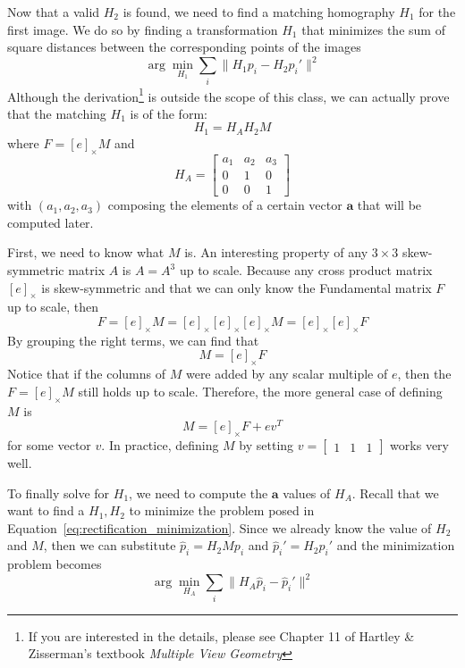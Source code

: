 \documentclass[a4paper, 12pt]{article}
\begin{document}
Now that a valid $H_2$ is found, we need to find a matching homography $H_1$ for the first image. We do so by finding a transformation $H_1$ that minimizes the sum of square distances between the corresponding points of the images
\begin{equation}
    \arg \min_{H_1} \sum_i \|H_1p_i - H_2 p_i'\|^2 
    \label{eq:rectification_minimization}
\end{equation}
Although the derivation\footnote{If you are interested in the details, please see Chapter 11 of Hartley \& Zisserman's textbook \textit{Multiple View Geometry}} is outside the scope of this class, we can actually prove that the matching $H_1$ is of the form:
\begin{equation}
    H_1 = H_A H_2 M
\label{eq:matching_homography}
\end{equation}
where $F= [e]_\times M$ and
\begin{equation}
    H_A = \begin{bmatrix} a_1 & a_2 & a_3\\ 0 & 1 & 0 \\ 0 & 0 &1\end{bmatrix}
\end{equation}
with $(a_1, a_2, a_3)$ composing the elements of a certain vector $\mathbf{a}$ that will be computed later. 

First, we need to know what $M$ is. An interesting property of any $3\times3$ skew-symmetric matrix $A$ is $A = A^3$ up to scale. Because any cross product matrix $[e]_\times$ is skew-symmetric and that we can only know the Fundamental matrix $F$ up to scale, then 
\begin{equation}
    F = [e]_\times M = [e]_\times [e]_\times [e]_\times M = [e]_\times [e]_\times F
\end{equation}
By grouping the right terms, we can find that 
\begin{equation}
    M = [e]_\times F
\end{equation}
Notice that if the columns of $M$ were added by any scalar multiple of $e$, then the $F = [e]_\times M$ still holds up to scale. Therefore, the more general case of defining $M$ is
\begin{equation}
    M = [e]_\times F + e v^T
\end{equation}
for some vector $v$. In practice, defining $M$ by setting $v=\begin{bmatrix}1 & 1 & 1\end{bmatrix}$ works very well.

To finally solve for $H_1$, we need to compute the $\mathbf{a}$ values of $H_A$. Recall that we want to find a $H_1, H_2$ to minimize the problem posed in Equation~\ref{eq:rectification_minimization}. Since we already know the value of $H_2$ and $M$, then we can substitute $\hat{p}_i = H_2Mp_i$ and $\hat{p}_i' = H_2p_i'$ and the minimization problem becomes
\begin{equation}
\arg \min_{H_A} \sum_i \|H_A\hat{p}_i - \hat{p}_i'\|^2 
\end{equation}
\end{document}

